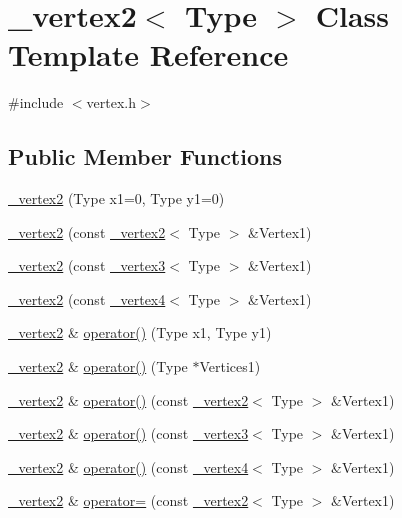 \hypertarget{class__vertex2}{\section{\+\_\+vertex2$<$ Type $>$ Class Template Reference}
\label{class__vertex2}
}


{\ttfamily \#include $<$vertex.\+h$>$}

\subsection*{Public Member Functions}
\begin{DoxyCompactItemize}
\item 
\hyperlink{class__vertex2_a1256006c9ec2eb04b345e95dd338db43}{\+\_\+vertex2} (Type x1=0, Type y1=0)
\item 
\hyperlink{class__vertex2_a92d580fe161cf58b45366d3b79c364b0}{\+\_\+vertex2} (const \hyperlink{class__vertex2}{\+\_\+vertex2}$<$ Type $>$ \&Vertex1)
\item 
\hyperlink{class__vertex2_a3be9f6ba0f78200493137b29f257f809}{\+\_\+vertex2} (const \hyperlink{class__vertex3}{\+\_\+vertex3}$<$ Type $>$ \&Vertex1)
\item 
\hyperlink{class__vertex2_a8df74c05af0965f0a36788a3a08dea54}{\+\_\+vertex2} (const \hyperlink{class__vertex4}{\+\_\+vertex4}$<$ Type $>$ \&Vertex1)
\item 
\hyperlink{class__vertex2}{\+\_\+vertex2} \& \hyperlink{class__vertex2_a62782569f4c29f40518e286a1cb8685b}{operator()} (Type x1, Type y1)
\item 
\hyperlink{class__vertex2}{\+\_\+vertex2} \& \hyperlink{class__vertex2_a8177cc59f40d48e3ef5fec43f88ba800}{operator()} (Type $\ast$Vertices1)
\item 
\hyperlink{class__vertex2}{\+\_\+vertex2} \& \hyperlink{class__vertex2_a8a091f80e485e6d8cff9ee2184f4a702}{operator()} (const \hyperlink{class__vertex2}{\+\_\+vertex2}$<$ Type $>$ \&Vertex1)
\item 
\hyperlink{class__vertex2}{\+\_\+vertex2} \& \hyperlink{class__vertex2_a8c33125f66c38434e5c7a6a910314468}{operator()} (const \hyperlink{class__vertex3}{\+\_\+vertex3}$<$ Type $>$ \&Vertex1)
\item 
\hyperlink{class__vertex2}{\+\_\+vertex2} \& \hyperlink{class__vertex2_a266c820652c758060707431cba08e186}{operator()} (const \hyperlink{class__vertex4}{\+\_\+vertex4}$<$ Type $>$ \&Vertex1)
\item 
\hyperlink{class__vertex2}{\+\_\+vertex2} \& \hyperlink{class__vertex2_a38bdd225746becf2db55ea7222529f83}{operator=} (const \hyperlink{class__vertex2}{\+\_\+vertex2}$<$ Type $>$ \&Vertex1)

\end{DoxyCompactItemize}
